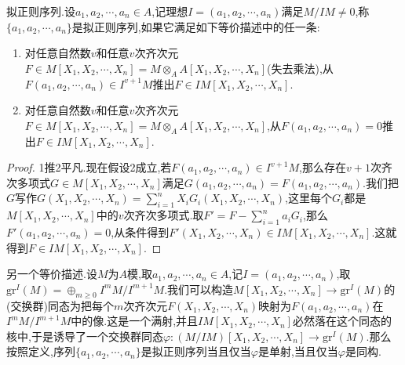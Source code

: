 拟正则序列.设$a_1,a_2,\cdots,a_n\in A$,记理想$I=(a_1,a_2,\cdots,a_n)$满足$M/IM\not=0$,称$\{a_1,a_2,\cdots,a_n\}$是拟正则序列,如果它满足如下等价描述中的任一条:
\begin{enumerate}
	\item 对任意自然数$v$和任意$v$次齐次元$F\in M[X_1,X_2,\cdots,X_n]=M\otimes_AA[X_1,X_2,\cdots,X_n]$(失去乘法),从$F(a_1,a_2,\cdots,a_n)\in I^{v+1}M$推出$F\in IM[X_1,X_2,\cdots,X_n]$.
	\item 对任意自然数$v$和任意$v$次齐次元$F\in M[X_1,X_2,\cdots,X_n]=M\otimes_AA[X_1,X_2,\cdots,X_n]$,从$F(a_1,a_2,\cdots,a_n)=0$推出$F\in IM[X_1,X_2,\cdots,X_n]$.
\end{enumerate}
\begin{proof}
	
	1推2平凡.现在假设2成立,若$F(a_1,a_2,\cdots,a_n)\in I^{v+1}M$,那么存在$v+1$次齐次多项式$G\in M[X_1,X_2,\cdots,X_n]$满足$G(a_1,a_2,\cdots,a_n)=F(a_1,a_2,\cdots,a_n)$.我们把$G$写作$G(X_1,X_2,\cdots,X_n)=\sum_{i=1}^nX_iG_i(X_1,X_2,\cdots,X_n)$,这里每个$G_i$都是$M[X_1,X_2,\cdots,X_n]$中的$v$次齐次多项式.取$F'=F-\sum_{i=1}^na_iG_i$,那么$F'(a_1,a_2,\cdots,a_n)=0$,从条件得到$F'(X_1,X_2,\cdots,X_n)\in IM[X_1,X_2,\cdots,X_n]$.这就得到$F\in IM[X_1,X_2,\cdots,X_n]$.
\end{proof}

另一个等价描述.设$M$为$A$模,取$a_1,a_2,\cdots,a_n\in A$,记$I=(a_1,a_2,\cdots,a_n)$,取$\mathrm{gr}^I(M)=\oplus_{m\ge0}I^mM/I^{m+1}M$.我们可以构造$M[X_1,X_2,\cdots,X_n]\to\mathrm{gr}^I(M)$的(交换群)同态为把每个$m$次齐次元$F(X_1,X_2,\cdots,X_n)$映射为$F(a_1,a_2,\cdots,a_n)$在$I^mM/I^{m+1}M$中的像.这是一个满射,并且$IM[X_1,X_2,\cdots,X_n]$必然落在这个同态的核中,于是诱导了一个交换群同态$\varphi:(M/IM)[X_1,X_2,\cdots,X_n]\to\mathrm{gr}^I(M)$.那么按照定义,序列$\{a_1,a_2,\cdots,a_n\}$是拟正则序列当且仅当$\varphi$是单射,当且仅当$\varphi$是同构.

